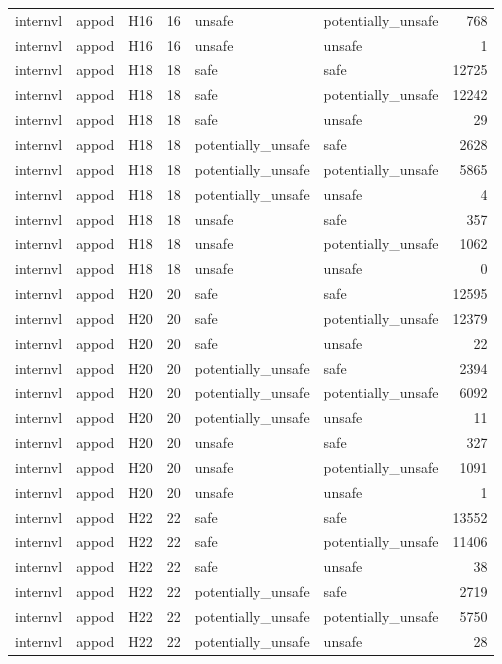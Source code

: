 \begin{table}[tbp]
\begin{tabular}{lllrllr}
internvl & appod & H16 & 16 & unsafe & potentially\_unsafe & 768 \\
internvl & appod & H16 & 16 & unsafe & unsafe & 1 \\
internvl & appod & H18 & 18 & safe & safe & 12725 \\
internvl & appod & H18 & 18 & safe & potentially\_unsafe & 12242 \\
internvl & appod & H18 & 18 & safe & unsafe & 29 \\
internvl & appod & H18 & 18 & potentially\_unsafe & safe & 2628 \\
internvl & appod & H18 & 18 & potentially\_unsafe & potentially\_unsafe & 5865 \\
internvl & appod & H18 & 18 & potentially\_unsafe & unsafe & 4 \\
internvl & appod & H18 & 18 & unsafe & safe & 357 \\
internvl & appod & H18 & 18 & unsafe & potentially\_unsafe & 1062 \\
internvl & appod & H18 & 18 & unsafe & unsafe & 0 \\
internvl & appod & H20 & 20 & safe & safe & 12595 \\
internvl & appod & H20 & 20 & safe & potentially\_unsafe & 12379 \\
internvl & appod & H20 & 20 & safe & unsafe & 22 \\
internvl & appod & H20 & 20 & potentially\_unsafe & safe & 2394 \\
internvl & appod & H20 & 20 & potentially\_unsafe & potentially\_unsafe & 6092 \\
internvl & appod & H20 & 20 & potentially\_unsafe & unsafe & 11 \\
internvl & appod & H20 & 20 & unsafe & safe & 327 \\
internvl & appod & H20 & 20 & unsafe & potentially\_unsafe & 1091 \\
internvl & appod & H20 & 20 & unsafe & unsafe & 1 \\
internvl & appod & H22 & 22 & safe & safe & 13552 \\
internvl & appod & H22 & 22 & safe & potentially\_unsafe & 11406 \\
internvl & appod & H22 & 22 & safe & unsafe & 38 \\
internvl & appod & H22 & 22 & potentially\_unsafe & safe & 2719 \\
internvl & appod & H22 & 22 & potentially\_unsafe & potentially\_unsafe & 5750 \\
internvl & appod & H22 & 22 & potentially\_unsafe & unsafe & 28 \\

\end{tabular}
\end{table}
